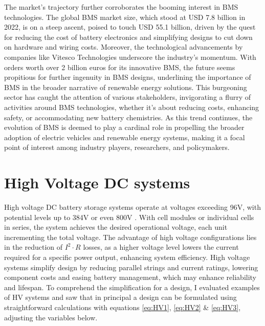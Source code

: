 \newpage
\noindent
The market's trajectory further corroborates the booming interest in BMS technologies. The global BMS market size, which stood at USD 7.8 billion in 2022, is on a steep ascent, poised to touch USD 55.1 billion, driven by the quest for reducing the cost of battery electronics and simplifying designs to cut down on hardware and wiring costs\cite{BMSSummit2023}.\newline\newline
\noindent
Moreover, the technological advancements by companies like Vitesco Technologies underscore the industry's momentum. With orders worth over 2 billion euros for its innovative BMS, the future seems propitious for further ingenuity in BMS designs, underlining the importance of BMS in the broader narrative of renewable energy solutions\cite{BatteriesNews2023}. This burgeoning sector has caught the attention of various stakeholders, invigorating a flurry of activities around BMS technologies, whether it's about reducing costs, enhancing safety, or accommodating new battery chemistries. As this trend continues, the evolution of BMS is deemed to play a cardinal role in propelling the broader adoption of electric vehicles and renewable energy systems, making it a focal point of interest among industry players, researchers, and policymakers.
\section{High Voltage DC systems}\label{sec:DC_SYST}
High voltage DC battery storage systems operate at voltages exceeding 96V, with potential levels up to 384V or even 800V \cite{source1}. With cell modules or individual cells in series, the system achieves the desired operational voltage, each unit incrementing the total voltage. The advantage of high voltage configurations lies in the reduction of $I^{2}\cdot R$ losses, as a higher voltage level lowers the current required for a specific power output, enhancing system efficiency. High voltage systems simplify design by reducing parallel strings and current ratings, lowering component costs and easing battery management, which may enhance reliability and lifespan. To comprehend the simplification for a design, I evaluated examples of HV systems and saw that in principal a design can be formulated using straightforward calculations with equations \ref{eq:HV1}, \ref{eq:HV2} \& \ref{eq:HV3}, adjusting the variables below.\newline

